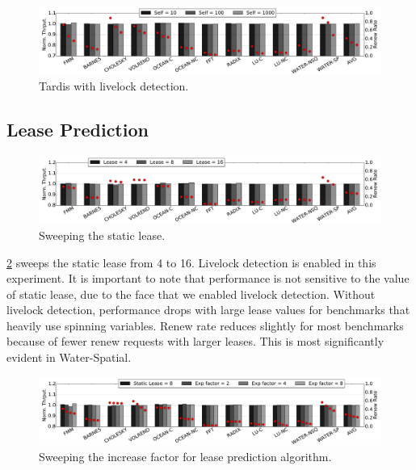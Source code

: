 \documentclass[12pt]{article}
\begin{document}
\begin{figure}
	\centering
	\includegraphics[width=0.95\columnwidth]{figs/selfincr_live.pdf}
	\caption{ Tardis with livelock detection. }
	\label{fig:self-live}
\end{figure}


\subsection{Lease Prediction}

\begin{figure}
	\centering
	\includegraphics[width=0.95\columnwidth]{figs/static.pdf}
	\caption{ Sweeping the static lease.  }
	\label{fig:static}
\end{figure}


\cref{fig:static} sweeps the static lease from 4 to 16. Livelock 
detection is enabled in this experiment. It is important to note that 
performance is not sensitive to the value of static lease, due to the 
face that we enabled livelock detection. Without livelock detection, 
performance drops with large lease values for benchmarks that heavily 
use spinning variables. Renew rate reduces slightly for most 
benchmarks because of fewer renew requests with larger leases. This is 
most significantly evident in Water-Spatial.

\begin{figure}
	\centering
	\includegraphics[width=0.95\columnwidth]{figs/exp.pdf}
	\caption{ Sweeping the increase factor for lease prediction 
	algorithm.}
	\label{fig:exp}
\end{figure}
\end{document}

